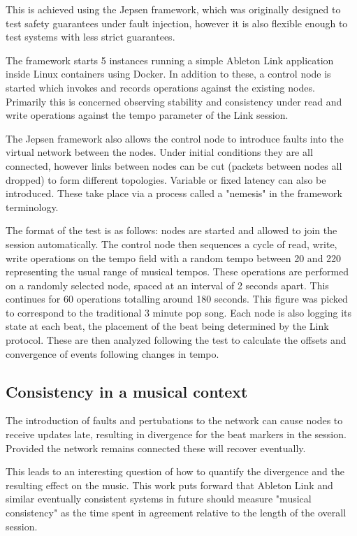 \documentclass[11pt]{article} %
\theoremstyle{plain}
\theoremstyle{definition}
\begin{document}
This is achieved using the Jepsen framework\cite{jepsen}, which was
originally designed to test safety guarantees under fault injection, however it
is also flexible enough to test systems with less strict guarantees.

The framework starts 5 instances running a simple Ableton Link application
inside Linux containers using Docker. In addition to these, a control node is
started which invokes and records operations against the existing nodes.
Primarily this is concerned observing stability and consistency under read and
write operations against the tempo parameter of the Link session.

The Jepsen framework also allows the control node to introduce faults into the
virtual network between the nodes. Under initial conditions they are all
connected, however links between nodes can be cut (packets between nodes all
dropped) to form different topologies. Variable or fixed latency can also be
introduced. These take place via a process called a "nemesis" in the framework
terminology.

The format of the test is as follows: nodes are started and allowed to join the
session automatically. The control node then sequences a cycle of read, write,
write operations on the tempo field with a random tempo between 20 and 220
representing the usual range of musical tempos. These operations are performed
on a randomly selected node, spaced at an interval of 2 seconds apart. This
continues for 60 operations totalling around 180 seconds. This figure was
picked to correspond to the traditional 3 minute pop song. Each node is also
logging its state at each beat, the placement of the beat being determined by
the Link protocol. These are then analyzed following the test to calculate the
offsets and convergence of events following changes in tempo.

\subsection{Consistency in a musical context}

The introduction of faults and pertubations to the network can cause nodes to
receive updates late, resulting in divergence for the beat markers in the
session. Provided the network remains connected these will recover eventually.

This leads to an interesting question of how to quantify the divergence and the
resulting effect on the music. This work puts forward that Ableton Link and
similar eventually consistent systems in future should measure "musical
consistency" as the time spent in agreement relative to the length of the
overall session.
\end{document}
